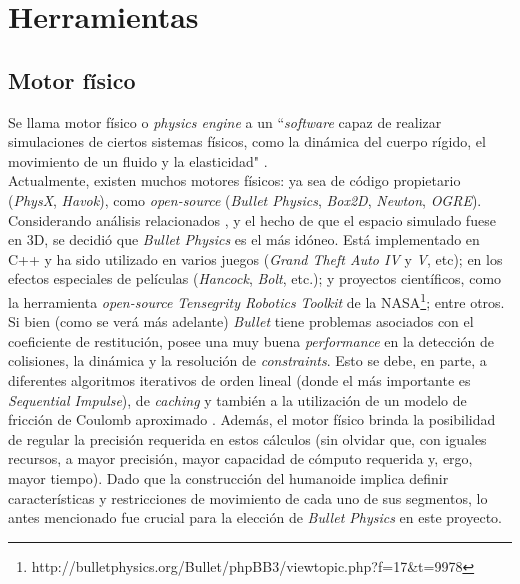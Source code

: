 \documentclass{article}
\begin{document}

\newpage


\section{Herramientas}

\subsection{Motor f\'isico}

Se llama motor f\'isico o \textit{physics engine} a un  ``\textit{software} capaz de realizar simulaciones de ciertos sistemas f\'isicos, como la din\'amica del cuerpo r\'igido, el movimiento de un fluido y la elasticidad" \cite{wikiPhysicsEngine}. \\
Actualmente, existen muchos motores f\'isicos: ya sea de c\'odigo propietario (\textit{PhysX}, \textit{Havok}), como \textit{open-source} (\textit{Bullet Physics}, \textit{Box2D}, \textit{Newton}, \textit{OGRE}). Considerando an\'alisis relacionados \cite{Comparissons}\cite{Comparissons2}, y el hecho de que el espacio simulado fuese en 3D, se decidi\'o que \textit{Bullet Physics}\cite{LinkBullet} es el m\'as id\'oneo. Est\'a implementado en C++ y ha sido utilizado en varios juegos (\textit{Grand Theft Auto IV} y \textit{V}, etc); en los efectos especiales de pel\'iculas (\textit{Hancock}, \textit{Bolt}, etc.); y proyectos cient\'ificos, como la herramienta \textit{open-source} \textit{Tensegrity Robotics Toolkit} de la NASA\footnote{http://bulletphysics.org/Bullet/phpBB3/viewtopic.php?f=17\&t=9978}; entre otros.\\
Si bien (como se ver\'a m\'as adelante) \textit{Bullet} tiene problemas asociados con el coeficiente de restituci\'on, posee una muy buena \textit{performance} en la detecci\'on de colisiones, la din\'amica y la resoluci\'on de \textit{constraints}. Esto se debe, en parte, a diferentes algoritmos iterativos de orden lineal (donde el m\'as importante es \textit{Sequential Impulse}), de \textit{caching} y tambi\'en a la utilizaci\'on de un modelo de fricci\'on de Coulomb aproximado \cite{Catto}. Adem\'as, el motor f\'isico brinda la posibilidad de regular la precisi\'on requerida en estos c\'alculos (sin olvidar que, con iguales recursos, a mayor precisi\'on, mayor capacidad de c\'omputo requerida y, ergo, mayor tiempo). Dado que la construcci\'on del humanoide implica definir caracter\'isticas y restricciones de movimiento de cada uno de sus segmentos, lo antes mencionado fue crucial para la elecci\'on de \textit{Bullet Physics} en este proyecto.
\end{document}
